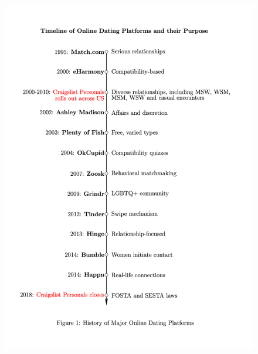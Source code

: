 \documentclass{beamer}
\begin{document}
\begin{frame}

\begin{figure}
    \centering
    \includegraphics[height=0.95\textheight]{./lecture_includes/craigslist_online}
\end{figure}

\end{frame}
\end{document}
